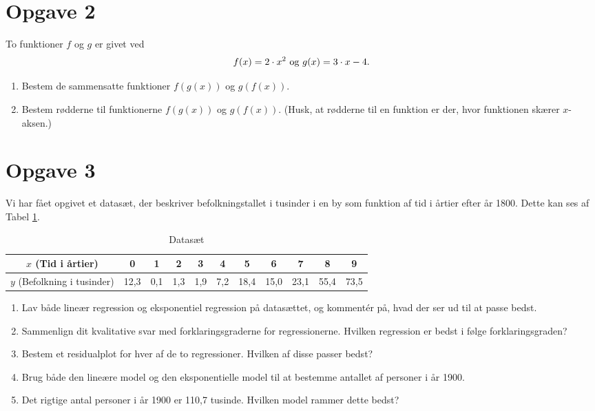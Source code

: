 \section*{Opgave 2}
To funktioner $f$ og $g$ er givet ved 
\begin{align*}
f(x) = 2\cdot x^2 \textnormal{ og } g(x) = 3\cdot x - 4.
\end{align*}
\begin{enumerate}[label=\roman*)]
\item Bestem de sammensatte funktioner $f(g(x))$ og $g(f(x))$. 
\item Bestem rødderne til funktionerne $f(g(x))$ og $g(f(x))$. (Husk, at rødderne til en funktion er der, hvor funktionen skærer $x$-aksen.)
\end{enumerate}
\section*{Opgave 3}
Vi har fået opgivet et datasæt, der beskriver befolkningstallet i tusinder i en by som funktion af tid i årtier efter år 1800. Dette kan ses af Tabel \ref{tab:datatab}.
\begin{table}[H]
\centering
\begin{tabular}{c|c|c|c|c|c|c|c|c|c|c}
$x$ (Tid i årtier) & 0&1&2&3&4&5&6&7&8&9 \\ \hline
$y$ (Befolkning i tusinder)& 12,3 & 0,1 & 1,3 & 1,9 & 7,2 & 18,4 & 15,0 & 23,1 & 55,4 & 73,5
\end{tabular}
\caption{Datasæt}
\label{tab:datatab}
\end{table}
\begin{enumerate}[label=\roman*)]
\item Lav både lineær regression og eksponentiel regression på datasættet, og kommentér på, hvad der ser ud til at passe bedst.
\item Sammenlign dit kvalitative svar med forklaringsgraderne for regressionerne. Hvilken regression er bedst i følge forklaringsgraden?
\item Bestem et residualplot for hver af de to regressioner. Hvilken af disse passer bedst?
\item Brug både den lineære model og den eksponentielle model til at bestemme antallet af personer i år 1900.
\item Det rigtige antal personer i år 1900 er 110,7 tusinde. Hvilken model rammer dette bedst?
\end{enumerate}

